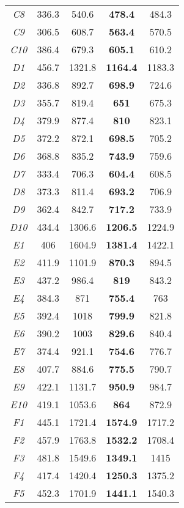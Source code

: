 {\begin{longtable}{ccccc}
\emph{C8}	&	336.3	&	540.6		&	\textbf{478.4}	&	484.3	\\
\emph{C9}	&	306.5	&	608.7		&	\textbf{563.4}	&	570.5	\\
\emph{C10}	&	386.4	&	679.3		&	\textbf{605.1}	&	610.2	\\ \hline
\emph{D1}	&	456.7	&	1321.8		&	\textbf{1164.4}	&	1183.3	\\
\emph{D2}	&	336.8	&	892.7		&	\textbf{698.9}	&	724.6	\\
\emph{D3}	&	355.7	&	819.4		&	\textbf{651}	&	675.3	\\
\emph{D4}	&	379.9	&	877.4		&	\textbf{810}	&	823.1	\\
\emph{D5}	&	372.2	&	872.1		&	\textbf{698.5}	&	705.2	\\
\emph{D6}	&	368.8	&	835.2		&	\textbf{743.9}	&	759.6	\\
\emph{D7}	&	333.4	&	706.3		&	\textbf{604.4}	&	608.5	\\
\emph{D8}	&	373.3	&	811.4		&	\textbf{693.2}	&	706.9	\\
\emph{D9}	&	362.4	&	842.7		&	\textbf{717.2}	&	733.9	\\
\emph{D10}	&	434.4	&	1306.6		&	\textbf{1206.5}	&	1224.9	\\ \hline
\emph{E1}	&	406	&	1604.9		&	\textbf{1381.4}	&	1422.1	\\
\emph{E2}	&	411.9	&	1101.9		&	\textbf{870.3}	&	894.5	\\
\emph{E3}	&	437.2	&	986.4		&	\textbf{819}	&	843.2	\\
\emph{E4}	&	384.3	&	871		&	\textbf{755.4}	&	763	\\
\emph{E5}	&	392.4	&	1018		&	\textbf{799.9}	&	821.8	\\
\emph{E6}	&	390.2	&	1003		&	\textbf{829.6}	&	840.4	\\
\emph{E7}	&	374.4	&	921.1		&	\textbf{754.6}	&	776.7	\\
\emph{E8}	&	407.7	&	884.6		&	\textbf{775.5}	&	790.7	\\
\emph{E9}	&	422.1	&	1131.7		&	\textbf{950.9}	&	984.7	\\
\emph{E10}	&	419.1	&	1053.6		&	\textbf{864}	&	872.9	\\ \hline
\emph{F1}	&	445.1	&	1721.4		&	\textbf{1574.9}	&	1717.2	\\
\emph{F2}	&	457.9	&	1763.8		&	\textbf{1532.2}	&	1708.4	\\
\emph{F3}	&	481.8	&	1549.6		&	\textbf{1349.1}	&	1415	\\
\emph{F4}	&	417.4	&	1420.4		&	\textbf{1250.3}	&	1375.2	\\
\emph{F5}	&	452.3	&	1701.9		&	\textbf{1441.1}	&	1540.3	\\

\end{longtable}}
